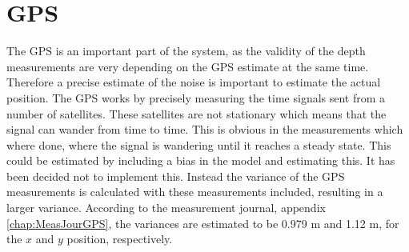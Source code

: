 \section{GPS}
The GPS is an important part of the system, as the validity of the depth measurements are very depending on the GPS estimate at the same time. Therefore a precise estimate of the noise is important to estimate the actual position. The GPS works by precisely measuring the time signals sent from a number of satellites. These satellites are not stationary which means that the signal can wander from time to time. This is obvious in the measurements which where done, where the signal is wandering until it reaches a steady state. This could be estimated by including a bias in the model and estimating this. It has been decided not to implement this.  Instead the variance of the GPS measurements is calculated with these measurements included, resulting in a larger variance.
According to the measurement journal, appendix \ref{chap:MeasJourGPS}, the variances are estimated to be 0.979 m and 1.12 m, for the $x$ and $y$ position, respectively.

